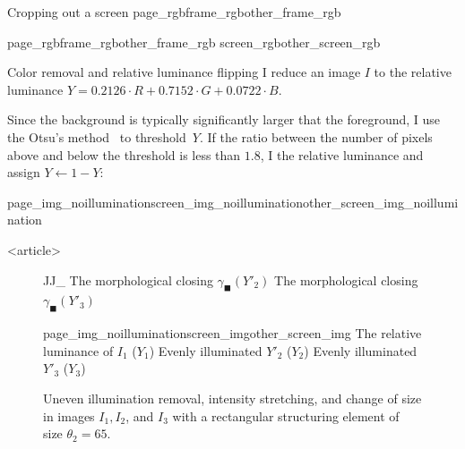 \begin{description}
\begin{frame}{Cropping out a screen}
      {page_rgb}{frame_rgb}{other_frame_rgb}%
  \end{frame}
  \begin{frame}[plain]
      {page_rgb}{frame_rgb}{other_frame_rgb}%
      {screen_rgb}{other_screen_rgb}%
  \end{frame}

  \begin{frame}{Color removal and relative luminance flipping}
    I reduce an image $I$ to the relative luminance $Y=0.2126\cdot
    R+0.7152\cdot G+0.0722\cdot B$.\pause

    Since the background is typically significantly larger that the foreground,
    I use the Otsu's method~\cite{otsu1979threshold} to threshold~$Y$. If the
    ratio between the number of pixels above and below the threshold is less
    than $1.8$, I  the relative luminance and assign
    $Y\leftarrow1-Y$:

    {page_img_noillumination}{screen_img_noillumination}{other_screen_img_noillumination}%
  \end{frame}

\mode
<article>

  \begin{figure}
      {J}{J_}%
      {The morphological closing $\gamma_\blacksquare(Y'_2)$}%
      {The morphological closing $\gamma_\blacksquare(Y'_3)$}\par
      {page_img_noillumination}{screen_img}{other_screen_img}%
      {The relative luminance of $I_1$ ($Y_1$)}%
      {Evenly illuminated $Y'_2$ ($Y_2$)}%
      {Evenly illuminated $Y'_3$ ($Y_3$)}
    \caption{Uneven illumination removal, intensity stretching, and change of
      size in images $I_1,I_2$, and $I_3$ with a rectangular structuring
      element of size $\theta_2 = 65$.}


\end{figure}
\end{description}
